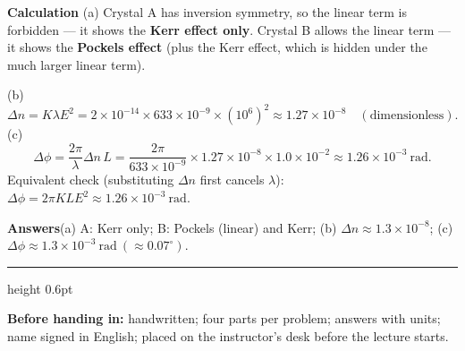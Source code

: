 \documentclass[10.5pt]{ctexart}
\begin{document}
\textbf{Calculation}\quad
(a) Crystal A has inversion symmetry, so the linear term is forbidden --- it shows the \textbf{Kerr effect only}.
Crystal B allows the linear term --- it shows the \textbf{Pockels effect} (plus the Kerr effect, which is
hidden under the much larger linear term).

(b)
\begin{equation*}
\Delta n=K\lambda E^{2}=2\times10^{-14}\times633\times10^{-9}\times\left(10^{6}\right)^{2}
\approx1.27\times10^{-8}\quad(\text{dimensionless}).
\end{equation*}
(c)
\begin{equation*}
\Delta\phi=\frac{2\pi}{\lambda}\Delta n\,L
=\frac{2\pi}{633\times10^{-9}}\times1.27\times10^{-8}\times1.0\times10^{-2}
\approx1.26\times10^{-3}\ \mathrm{rad}.
\end{equation*}
Equivalent check (substituting $\Delta n$ first cancels $\lambda$):
$\Delta\phi=2\pi KLE^{2}\approx1.26\times10^{-3}\ \mathrm{rad}$.

\textbf{Answers}\quad (a) A: Kerr only; B: Pockels (linear) and Kerr;\qquad
(b) $\Delta n\approx1.3\times10^{-8}$;\qquad
(c) $\Delta\phi\approx1.3\times10^{-3}\ \mathrm{rad}\ (\approx0.07^{\circ})$.

\vspace{4pt}
{\color{petal}\hrule height 0.6pt}
{\small\color{inkgray}\textbf{Before handing in:} handwritten; four parts per problem; answers with units;
name signed in English; placed on the instructor's desk before the lecture starts.}
\end{document}
